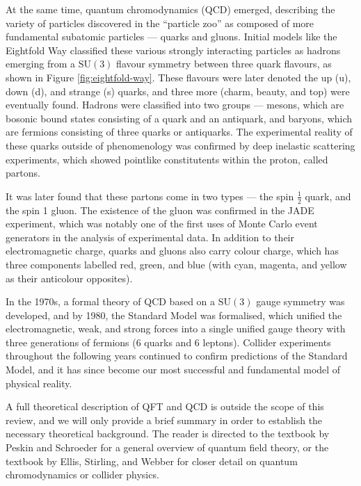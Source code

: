 \documentclass[12pt,a4paper]{report}
\begin{document}
At the same time, quantum chromodynamics (QCD) emerged, describing the variety of particles discovered in the ``particle zoo'' as composed of more fundamental subatomic particles --- quarks and gluons. Initial models like the Eightfold Way classified these various strongly interacting particles as hadrons emerging from a $\text{SU}(3)$ flavour symmetry between three quark flavours, as shown in Figure \ref{fig:eightfold-way}. These flavours were later denoted the up (u), down (d), and strange (s) quarks, and three more (charm, beauty, and top) were eventually found. Hadrons were classified into two groups --- mesons, which are bosonic bound states consisting of a quark and an antiquark, and baryons, which are fermions consisting of three quarks or antiquarks. The experimental reality of these quarks outside of phenomenology was confirmed by deep inelastic scattering experiments, which showed pointlike constitutents within the proton, called partons.

It was later found that these partons come in two types --- the spin $\frac{1}{2}$ quark, and the spin 1 gluon. The existence of the gluon was confirmed in the JADE experiment, which was notably one of the first uses of Monte Carlo event generators in the analysis of experimental data. In addition to their electromagnetic charge, quarks and gluons also carry colour charge, which has three components labelled red, green, and blue (with cyan, magenta, and yellow as their anticolour opposites).

In the 1970s, a formal theory of QCD based on a $\text{SU}(3)$ gauge symmetry was developed, and by 1980, the Standard Model was formalised, which unified the electromagnetic, weak, and strong forces into a single unified gauge theory with three generations of fermions (6 quarks and 6 leptons). Collider experiments throughout the following years continued to confirm predictions of the Standard Model, and it has since become our most successful and fundamental model of physical reality.

A full theoretical description of QFT and QCD is outside the scope of this review, and we will only provide a brief summary in order to establish the necessary theoretical background. The reader is directed to the textbook by Peskin and Schroeder for a general overview of quantum field theory, or the textbook by Ellis, Stirling, and Webber for closer detail on quantum chromodynamics or collider physics.
\end{document}
